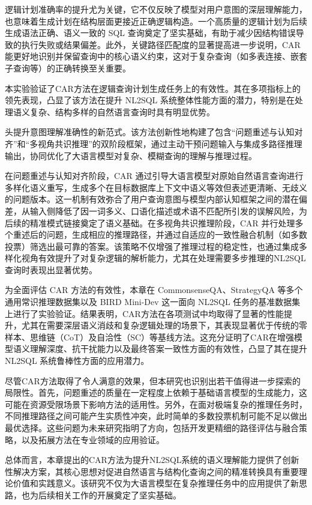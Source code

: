 \documentclass[12pt,a4paper,openright,UTF8]{ctexbook}
\begin{document}
逻辑计划准确率的提升尤为关键，它不仅反映了模型对用户意图的深层理解能力，也意味着生成计划在结构层面更接近正确逻辑构造。一个高质量的逻辑计划为后续生成语法正确、语义一致的 SQL 查询奠定了坚实基础，有助于减少因结构错误导致的执行失败或结果偏差。此外，关键路径匹配度的显著提高进一步说明，CAR 能更好地识别并保留查询中的核心语义约束，这对于复杂查询（如多表连接、嵌套子查询等）的正确转换至关重要。


本实验验证了CAR方法在逻辑查询计划生成任务上的有效性。其在多项指标上的领先表现，凸显了该方法在提升 NL2SQL 系统整体性能方面的潜力，特别是在处理语义复杂、结构多样的自然语言查询时具有明显优势。


头提升意图理解准确性的新范式。该方法创新性地构建了包含“问题重述与认知对齐”和“多视角共识推理”的双阶段框架，通过主动干预问题输入与集成多路径推理输出，协同优化了大语言模型对复杂、模糊查询的理解与推理过程。


在问题重述与认知对齐阶段，CAR 通过引导大语言模型对原始自然语言查询进行多样化语义重写，生成多个在目标数据库上下文中语义等效但表述更清晰、无歧义的问题版本。这一机制有效弥合了用户查询意图与模型内部认知框架之间的潜在偏差，从输入侧降低了因一词多义、口语化描述或术语不匹配所引发的误解风险，为后续的精准模式链接奠定了语义基础。在多视角共识推理阶段，CAR 并行处理多个重述后的问题，生成相应的推理路径，并通过自适应的一致性融合机制（如多数投票）筛选出最可靠的答案。该策略不仅增强了推理过程的稳定性，也通过集成多样化视角有效提升了对复杂逻辑的解析能力，尤其在处理需要多步推理的NL2SQL 查询时表现出显著优势。


为全面评估 CAR 方法的有效性，本章在 CommonsenseQA、StrategyQA 等多个通用常识推理数据集以及 BIRD Mini-Dev 这一面向 NL2SQL 任务的基准数据集上进行了实验验证。结果表明，CAR方法在各项测试中均取得了显著的性能提升，尤其在需要深层语义消歧和复杂逻辑处理的场景下，其表现显著优于传统的零样本、思维链（CoT）及自洽性（SC）等基线方法。这充分证明了CAR在增强模型语义理解深度、抗干扰能力以及最终答案一致性方面的有效性，凸显了其在提升NL2SQL 系统鲁棒性方面的应用潜力。


尽管CAR方法取得了令人满意的效果，但本研究也识别出若干值得进一步探索的局限性。首先，问题重述的质量在一定程度上依赖于基础语言模型的生成能力，这可能在资源受限场景下影响方法的适用性。另外，在面对极端复杂的推理任务时，不同推理路径之间可能产生实质性冲突，此时简单的多数投票机制可能不足以做出最优选择。这些问题为未来研究指明了方向，包括开发更精细的路径评估与融合策略，以及拓展方法在专业领域的应用验证。


总体而言，本章提出的CAR方法为提升NL2SQL系统的语义理解能力提供了创新性解决方案，其核心思想对促进自然语言与结构化查询之间的精准转换具有重要理论价值和实践意义。该研究不仅为大语言模型在复杂推理任务中的应用提供了新思路，也为后续相关工作的开展奠定了坚实基础。
\end{document}
